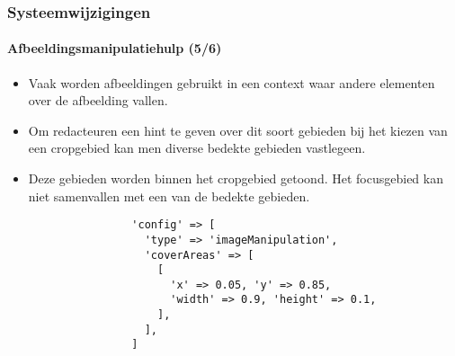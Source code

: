 
\begin{frame}[fragile]
	\frametitle{Systeemwijzigingen}
	\framesubtitle{Afbeeldingsmanipulatiehulp (5/6)}

	\lstset{basicstyle=\tiny\ttfamily}

	\begin{itemize}
		\item Vaak worden afbeeldingen gebruikt in een context waar andere elementen over de afbeelding vallen.
		\item Om redacteuren een hint te geven over dit soort gebieden bij het kiezen van een cropgebied kan men
		 	diverse bedekte gebieden vastlegeen.
		\item Deze gebieden worden binnen het cropgebied getoond. Het focusgebied kan niet samenvallen met een van
		 	de bedekte gebieden.

			\begin{lstlisting}
				'config' => [
				  'type' => 'imageManipulation',
				  'coverAreas' => [
				    [
				      'x' => 0.05, 'y' => 0.85,
				      'width' => 0.9, 'height' => 0.1,
				    ],
				  ],
				]
			\end{lstlisting}

	\end{itemize}

\end{frame}


